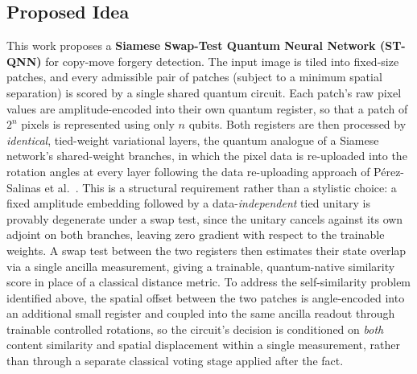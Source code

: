 \documentclass[conference]{IEEEtran}
\begin{document}
\subsection{Proposed Idea}
This work proposes a \textbf{Siamese Swap-Test Quantum Neural Network (ST-QNN)} for copy-move forgery detection. The input image is tiled into fixed-size patches, and every admissible pair of patches (subject to a minimum spatial separation) is scored by a single shared quantum circuit. Each patch's raw pixel values are amplitude-encoded into their own quantum register, so that a patch of $2^n$ pixels is represented using only $n$ qubits. Both registers are then processed by \emph{identical}, tied-weight variational layers, the quantum analogue of a Siamese network's shared-weight branches, in which the pixel data is re-uploaded into the rotation angles at every layer following the data re-uploading approach of P\'erez-Salinas et al.~\cite{reuploading2020}. This is a structural requirement rather than a stylistic choice: a fixed amplitude embedding followed by a data-\emph{independent} tied unitary is provably degenerate under a swap test, since the unitary cancels against its own adjoint on both branches, leaving zero gradient with respect to the trainable weights. A swap test between the two registers then estimates their state overlap via a single ancilla measurement, giving a trainable, quantum-native similarity score in place of a classical distance metric. To address the self-similarity problem identified above, the spatial offset between the two patches is angle-encoded into an additional small register and coupled into the same ancilla readout through trainable controlled rotations, so the circuit's decision is conditioned on \emph{both} content similarity and spatial displacement within a single measurement, rather than through a separate classical voting stage applied after the fact.
\end{document}
